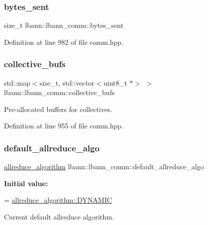 \subsubsection{\texorpdfstring{bytes\+\_\+sent}{bytes\_sent}}
{\footnotesize\ttfamily size\+\_\+t lbann\+::lbann\+\_\+comm\+::bytes\+\_\+sent\hspace{0.3cm}{\ttfamily [private]}}



Definition at line 982 of file comm.\+hpp.

\mbox{\label{classlbann_1_1lbann__comm_a9ada8c5daf902f43b599234c7519a765}} 
\subsubsection{\texorpdfstring{collective\+\_\+bufs}{collective\_bufs}}
{\footnotesize\ttfamily std\+::map$<$size\+\_\+t, std\+::vector$<$uint8\+\_\+t $\ast$$>$ $>$ lbann\+::lbann\+\_\+comm\+::collective\+\_\+bufs\hspace{0.3cm}{\ttfamily [private]}}

Pre-\/allocated buffers for collectives. 

Definition at line 955 of file comm.\+hpp.

\mbox{\label{classlbann_1_1lbann__comm_ac7731d6bcdb6775009467cf4138d4bab}} 
\subsubsection{\texorpdfstring{default\+\_\+allreduce\+\_\+algo}{default\_allreduce\_algo}}
{\footnotesize\ttfamily \hyperlink{classlbann_1_1lbann__comm_a02a03227cc27e3516f0d9f9812f32019}{allreduce\+\_\+algorithm} lbann\+::lbann\+\_\+comm\+::default\+\_\+allreduce\+\_\+algo\hspace{0.3cm}{\ttfamily [private]}}

{\bfseries Initial value\+:}
\begin{DoxyCode}
=
    \hyperlink{classlbann_1_1lbann__comm_a02a03227cc27e3516f0d9f9812f32019a0fcc90da4811c877ba9f9c12f7d60bc9}{allreduce\_algorithm::DYNAMIC}
\end{DoxyCode}
Current default allreduce algorithm. 

